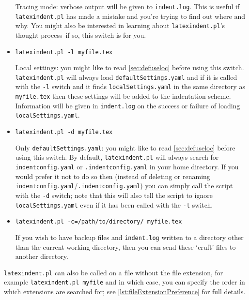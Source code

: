 \documentclass[11pt]{article}
\newcommand{\verbitem}[1]{\small\ttfamily{#1}}
\begin{document}
\begin{itemize}[labelsep=.5cm]
		Tracing mode: verbose output will be given to \lstinline!indent.log!. This
		is useful if \lstinline!latexindent.pl! has made a mistake and you're
		trying to find out where and why. You might also be interested in learning
		about \lstinline!latexindent.pl!'s thought process--if so, this
		switch is for you.
	\item[\verbitem{-l}] \lstinline!latexindent.pl -l myfile.tex!

		\label{page:localswitch}
		Local settings: you might like to read \cref{sec:defuseloc} before
		using this switch. \lstinline!latexindent.pl! will always load \lstinline!defaultSettings.yaml!
		and if it is called with the \lstinline!-l! switch and it finds \lstinline!localSettings.yaml!
		in the same directory as \lstinline!myfile.tex! then these settings will be
		added to the indentation scheme. Information will be given in \lstinline!indent.log! on
		the success or failure of loading \lstinline!localSettings.yaml!.
	\item[\verbitem{-d}] \lstinline!latexindent.pl -d myfile.tex!

		Only \lstinline!defaultSettings.yaml!: you might like to read \cref{sec:defuseloc} before
		using this switch. By default, \lstinline!latexindent.pl! will always search for
		\lstinline!indentconfig.yaml! or \lstinline!.indentconfig.yaml!  in your home directory. If you would prefer it not to do so
		then (instead of deleting or renaming \lstinline!indentconfig.yaml!/\lstinline!.indentconfig.yaml!) you can simply
		call the script with the \lstinline!-d! switch; note that this will also tell
		the script to ignore \lstinline!localSettings.yaml! even if it has been called with the
		\lstinline!-l! switch.

	\item[\verbitem{-c}]\lstinline!latexindent.pl -c=/path/to/directory/ myfile.tex!

		If you wish to have backup files and \lstinline!indent.log! written to a directory
		other than the current working directory, then you can send these `cruft' files
		to another directory.
\end{itemize}

\lstinline!latexindent.pl! can also be called on a file without the file extension, for
example \lstinline!latexindent.pl myfile! and in which case, you can specify 
the order in which extensions are searched for; see \vref{lst:fileExtensionPreference} 
for full details.
\end{document}
